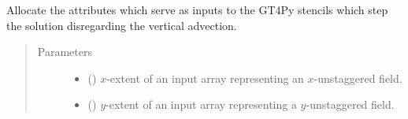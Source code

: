 \documentclass[letterpaper,10pt,english]{sphinxmanual}
\begin{document}
\begin{fulllineitems}
\begin{fulllineitems}
\begin{quote}
\begin{description}
\begin{itemize}
\begin{itemize}
\end{itemize}


\end{itemize}

\end{description}\end{quote}

\end{fulllineitems}


\begin{fulllineitems}
\label{\detokenize{api:tasmania.dycore.prognostic_isentropic_nonconservative.PrognosticIsentropicNonconservative._stencils_stepping_by_neglecting_vertical_advection_allocate_inputs}}
Allocate the attributes which serve as inputs to the GT4Py stencils which step the solution
disregarding the vertical advection.
\begin{quote}\begin{description}
\item[{Parameters}] \leavevmode\begin{itemize}
\item {} 
 () \textendash{} \(x\)-extent of an input array representing an \(x\)-unstaggered field.

\item {} 
 () \textendash{} \(y\)-extent of an input array representing a \(y\)-unstaggered field.

\end{itemize}

\end{description}\end{quote}

\end{fulllineitems}



\end{fulllineitems}
\end{document}
